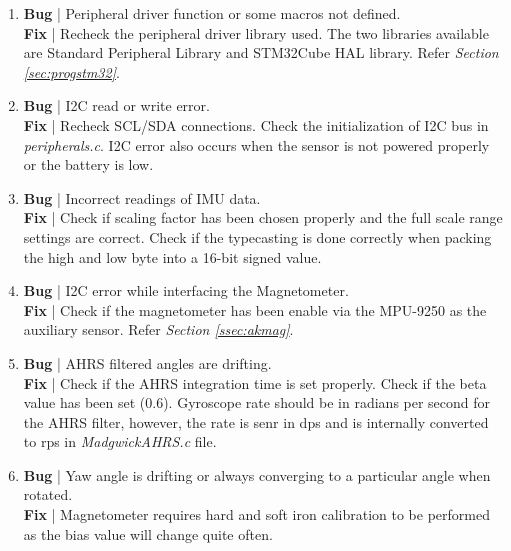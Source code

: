 \documentclass[a4paper,12pt,oneside]{book}
\begin{document}
\begin{enumerate}
\item \textbf{Bug} | Peripheral driver function or some macros not defined.\\
\textbf{Fix} | Recheck the peripheral driver library used. The two libraries available are Standard Peripheral Library and STM32Cube HAL library. Refer \textit{Section \ref{sec:progstm32}}.\\

\item \textbf{Bug} | I2C read or write error.\\
\textbf{Fix} | Recheck SCL/SDA connections. Check the initialization of I2C bus in \textit{peripherals.c}. I2C error also occurs when the sensor is not powered properly or the battery is low.\\

\item \textbf{Bug} | Incorrect readings of IMU data.\\
\textbf{Fix} | Check if scaling factor has been chosen properly and the full scale range settings are correct. Check if the typecasting is done correctly when packing the high and low byte into a 16-bit signed value.\\

\item \textbf{Bug} | I2C error while interfacing the Magnetometer.\\
\textbf{Fix} | Check if the magnetometer has been enable via the MPU-9250 as the auxiliary sensor. Refer \textit{Section \ref{ssec:akmag}}.\\

\clearpage

\item \textbf{Bug} | AHRS filtered angles are drifting.\\
\textbf{Fix} | Check if the AHRS integration time is set properly. Check if the beta value has been set (0.6). Gyroscope rate should be in radians per second for the AHRS filter, however, the rate is senr in dps and is internally converted to rps in \textit{MadgwickAHRS.c} file.\\

\item \textbf{Bug} | Yaw angle is drifting or always converging to a particular angle when rotated.\\
\textbf{Fix} | Magnetometer requires hard and soft iron calibration to be performed as the bias value will change quite often.\\


\end{enumerate}
\end{document}
